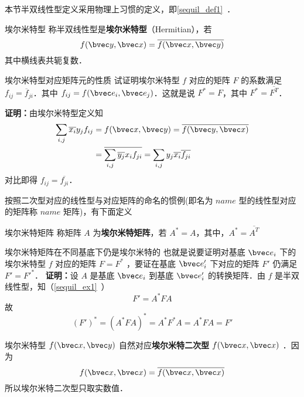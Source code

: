 本节半双线性型定义采用物理上习惯的定义，即\autoref{sequil_def1}~．
\begin{definition}{埃尔米特型}
称半双线性型是\textbf{埃尔米特型}（Hermitian），若
\begin{equation}\label{HeFor_eq2}
f(\bvec y,\bvec x)=\overline{f(\bvec x,\bvec y)}
\end{equation}
其中横线表共轭复数．
\end{definition}
\begin{example}{埃尔米特型对应矩阵元的性质}
试证明埃尔米特型 $f$ 对应的矩阵 $F$ 的系数满足 $f_{ij}=\overline f_{ji}$．其中 $f_{ij}=f(\bvec e_i,\bvec e_j)$．这就是说 $F^*=F$，其中 $F^*=\overline {F^T}$．

\textbf{证明：}由埃尔米特型定义知
\begin{equation}
\begin{aligned}
\sum_{i,j}\overline{x_i}y_j f_{ij}&=f(\bvec x,\bvec y)=\overline{f(\bvec y,\bvec x)}\\
&=\overline{\sum_{i,j}\overline{y_j} x_i f_{ji}}=\sum_{i,j}y_j\overline{x_i}\overline{f_{ji}}
\end{aligned}
\end{equation}
对比即得 $f_{ij}=\overline{f_{ji}}$．
\end{example}
按照二次型对应的线性型与对应矩阵的命名的惯例(即名为 $name$ 型的线性型对应的矩阵称 $name$ 矩阵)，有下面定义
\begin{definition}{埃尔米特矩阵}
称矩阵 $A$ 为\textbf{埃尔米特矩阵}，若 $A^*=A$，其中，$A^*=\overline{A^T}$
\end{definition}
\begin{example}{埃尔米特矩阵在不同基底下仍是埃尔米特的}
也就是说要证明对基底 $\bvec e_i$ 下的埃尔米特型 $f$ 对应的矩阵 $F=F^*$ ，要证在基底 $\bvec e'_i$ 下对应的矩阵 $F'$ 仍满足 $F'=F'^*$．
\textbf{证明：}设 $A$ 是基底 $\bvec e_i$ 到基底 $\bvec e'_i$ 的转换矩阵．由 $f$ 是半双线性型，知（\autoref{sequil_ex1}~）
\begin{equation}
F'=A^*FA
\end{equation}
 故
\begin{equation}
(F')^*=(A^*FA)^*=A^*F^*A=A^*FA=F'
\end{equation}
\end{example}
埃尔米特型 $f(\bvec x,\bvec y)$ 自然对应\textbf{埃尔米特二次型} $f(\bvec x,\bvec x)$ ．因为
\begin{equation}
 f(\bvec x,\bvec x)= \overline{f(\bvec x,\bvec x)} 
\end{equation}
所以埃尔米特二次型只取实数值．

